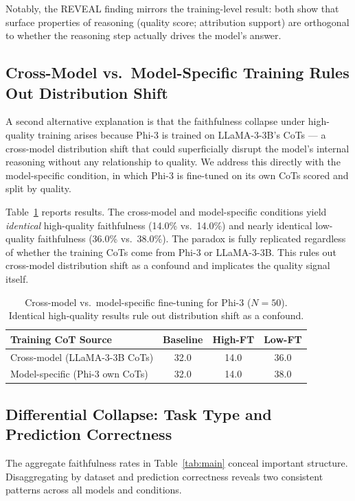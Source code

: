 \documentclass[11pt]{article}
\begin{document}
Notably, the REVEAL finding mirrors the training-level result: both show that
surface properties of reasoning (quality score; attribution support) are
orthogonal to whether the reasoning step actually drives the model's answer.

\subsection{Cross-Model vs.\ Model-Specific Training Rules Out Distribution Shift}
\label{sec:crossmodel}

A second alternative explanation is that the faithfulness collapse under
high-quality training arises because Phi-3 is trained on LLaMA-3-3B's CoTs
--- a cross-model distribution shift that could superficially disrupt the
model's internal reasoning without any relationship to quality. We address this
directly with the model-specific condition, in which Phi-3 is fine-tuned on
its own CoTs scored and split by quality.

Table~\ref{tab:crossmodel} reports results. The cross-model and model-specific
conditions yield \emph{identical} high-quality faithfulness (14.0\% vs.\
14.0\%) and nearly identical low-quality faithfulness (36.0\% vs.\ 38.0\%).
The paradox is fully replicated regardless of whether the training CoTs come
from Phi-3 or LLaMA-3-3B. This rules out cross-model distribution shift as a
confound and implicates the quality signal itself.

\begin{table}[t]
\centering
\small
\caption{Cross-model vs.\ model-specific fine-tuning for Phi-3 ($N = 50$).
Identical high-quality results rule out distribution shift as a confound.}
\label{tab:crossmodel}
\begin{tabular}{lccc}
\toprule
Training CoT Source & Baseline & High-FT & Low-FT \\
\midrule
Cross-model (LLaMA-3-3B CoTs)  & 32.0 & 14.0 & 36.0 \\
Model-specific (Phi-3 own CoTs) & 32.0 & 14.0 & 38.0 \\
\bottomrule
\end{tabular}
\end{table}

\subsection{Differential Collapse: Task Type and Prediction Correctness}
\label{sec:differential}

The aggregate faithfulness rates in Table~\ref{tab:main}
conceal important structure. Disaggregating by dataset and
prediction correctness reveals two consistent patterns across all
models and conditions.
\end{document}
